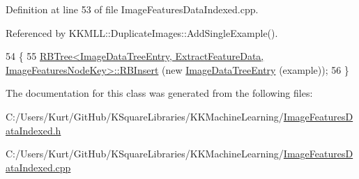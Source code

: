 Definition at line 53 of file Image\+Features\+Data\+Indexed.\+cpp.



Referenced by K\+K\+M\+L\+L\+::\+Duplicate\+Images\+::\+Add\+Single\+Example().


\begin{DoxyCode}
54 \{
55   \hyperlink{class_k_k_b_1_1_r_b_tree}{RBTree<ImageDataTreeEntry, ExtractFeatureData, ImageFeaturesNodeKey>::RBInsert}
       (\textcolor{keyword}{new} \hyperlink{class_k_k_m_l_l_1_1_image_data_tree_entry}{ImageDataTreeEntry} (example));
56 \}
\end{DoxyCode}


The documentation for this class was generated from the following files\+:\begin{DoxyCompactItemize}
\item 
C\+:/\+Users/\+Kurt/\+Git\+Hub/\+K\+Square\+Libraries/\+K\+K\+Machine\+Learning/\hyperlink{_image_features_data_indexed_8h}{Image\+Features\+Data\+Indexed.\+h}\item 
C\+:/\+Users/\+Kurt/\+Git\+Hub/\+K\+Square\+Libraries/\+K\+K\+Machine\+Learning/\hyperlink{_image_features_data_indexed_8cpp}{Image\+Features\+Data\+Indexed.\+cpp}\end{DoxyCompactItemize}
